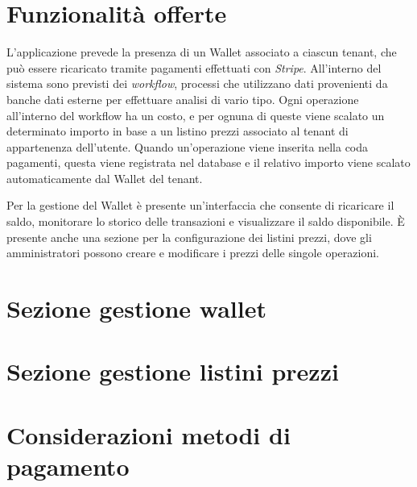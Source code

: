 \section{Funzionalità offerte}
L'applicazione prevede la presenza di un Wallet associato a ciascun tenant, che pu\`o essere ricaricato tramite pagamenti effettuati con \textit{Stripe}.
All'interno del sistema sono previsti dei \textit{workflow}, processi che utilizzano dati provenienti da banche dati esterne per effettuare analisi di vario tipo.
Ogni operazione all'interno del workflow ha un costo, e per ognuna di queste viene scalato un determinato importo in base a un listino prezzi associato al tenant di appartenenza dell'utente.
Quando un'operazione viene inserita nella coda pagamenti, questa viene registrata nel database e il relativo importo viene scalato automaticamente dal Wallet del tenant.

Per la gestione del Wallet \`e presente un'interfaccia che consente di ricaricare il saldo, monitorare lo storico delle transazioni e visualizzare il saldo disponibile.
\`E presente anche una sezione per la configurazione dei listini prezzi, dove gli amministratori possono creare e modificare i prezzi delle singole operazioni.

\section{Sezione gestione wallet}

\section{Sezione gestione listini prezzi}

\section{Considerazioni metodi di pagamento}
